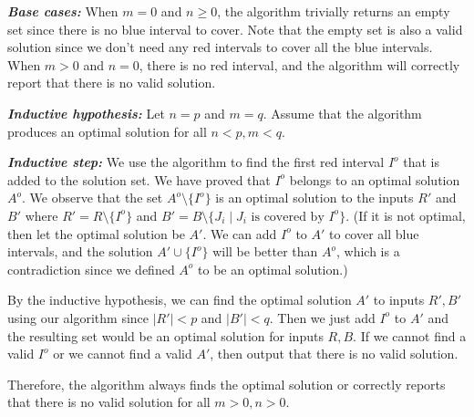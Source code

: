 \documentclass[11pt]{article}
\begin{document}
\begin{solution}
\begin{enumerate}[(a)]
\emph{\textbf{Base cases:}} When $m=0$ and $n\ge 0$, the algorithm trivially returns an empty set since there is no blue interval to cover. Note that the empty set is also a valid solution since we don't need any red intervals to cover all the blue intervals. When $m>0$ and $n=0$, there is no red interval, and the algorithm will correctly report that there is no valid solution.

\emph{\textbf{Inductive hypothesis:}} Let $n=p$ and $m=q$. Assume that the algorithm produces an optimal solution for all $n<p, m<q$.

\emph{\textbf{Inductive step:}} We use the algorithm to find the first red interval $I^o$ that is added to the solution set. We have proved that $I^o$ belongs to an optimal solution $A^o$. We observe that the set $A^o\setminus \{I^o\}$ is an optimal solution to the inputs $R'$ and $B'$ where $R'=R \setminus \{I^o\}$ and $B'=B\setminus \{J_i\mid \text{$J_i$ is covered by $I^o$}\}$. (If it is not optimal, then let the optimal solution be $A'$. We can add $I^o$ to $A'$ to cover all blue intervals, and the solution $A'\cup \{I^o\}$ will be better than $A^o$, which is a contradiction since we defined $A^o$ to be an optimal solution.)

By the inductive hypothesis, we can find the optimal solution $A'$ to inputs $R', B'$ using our algorithm since $|R'|<p$ and $|B'|<q$. Then we just add $I^o$ to $A'$ and the resulting set would be an optimal solution for inputs $R, B$. If we cannot find a valid $I^o$ or we cannot find a valid $A'$, then output that there is no valid solution.

Therefore, the algorithm always finds the optimal solution or correctly reports that there is no valid solution for all $m>0, n>0$.

\end{enumerate}
\end{solution}
\end{document}
